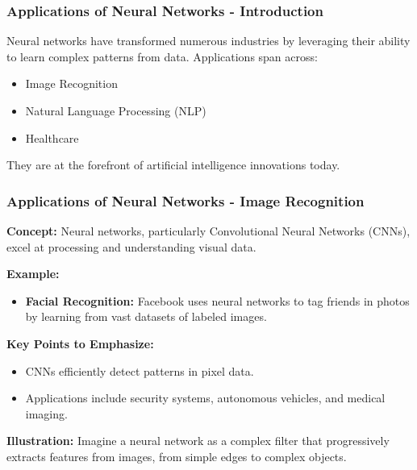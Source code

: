 \documentclass[aspectratio=169]{beamer}
\begin{document}
\begin{frame}[fragile]
  \frametitle{Applications of Neural Networks - Introduction}
  Neural networks have transformed numerous industries by leveraging their ability to learn complex patterns from data. 
  Applications span across:
  \begin{itemize}
      \item Image Recognition
      \item Natural Language Processing (NLP)
      \item Healthcare
  \end{itemize}
  They are at the forefront of artificial intelligence innovations today.
\end{frame}

\begin{frame}[fragile]
  \frametitle{Applications of Neural Networks - Image Recognition}
  \textbf{Concept:} Neural networks, particularly Convolutional Neural Networks (CNNs), excel at processing and understanding visual data.

  \textbf{Example:} 
  \begin{itemize}
      \item \textbf{Facial Recognition:} Facebook uses neural networks to tag friends in photos by learning from vast datasets of labeled images.
  \end{itemize}

  \textbf{Key Points to Emphasize:}
  \begin{itemize}
      \item CNNs efficiently detect patterns in pixel data.
      \item Applications include security systems, autonomous vehicles, and medical imaging.
  \end{itemize}
  
  \textbf{Illustration:} 
  Imagine a neural network as a complex filter that progressively extracts features from images, from simple edges to complex objects.
\end{frame}
\end{document}
